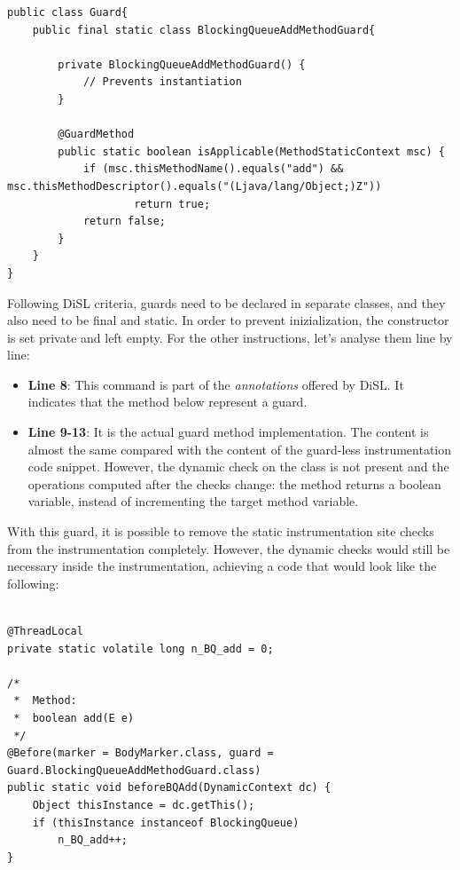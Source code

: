 \documentclass[]{usiinfthesis}
\begin{document}
\vspace*{0.5cm}
\begin{verbatim}
public class Guard{
    public final static class BlockingQueueAddMethodGuard{
    
        private BlockingQueueAddMethodGuard() {
            // Prevents instantiation
        }
    
        @GuardMethod
        public static boolean isApplicable(MethodStaticContext msc) {
            if (msc.thisMethodName().equals("add") && msc.thisMethodDescriptor().equals("(Ljava/lang/Object;)Z"))
                    return true;
            return false;
        }
    }
}
\end{verbatim}

\vspace*{0.5cm}

\noindent
Following DiSL criteria, guards need to be declared in separate classes, and they also need to be final and static. In order to prevent inizialization, the constructor is set private and left empty. For the other instructions, let's analyse them line by line:


\begin{itemize}
    \item \textbf{Line 8}: This command is part of the \textit{annotations} offered by DiSL. It indicates that the method below represent a guard.
    
    \item \textbf{Line 9-13}: It is the actual guard method implementation. The content is almost the same compared with the content of the guard-less instrumentation code snippet. However, the dynamic check on the class is not present and the operations computed after the checks change: the method returns a boolean variable, instead of incrementing the target method variable.
\end{itemize}

\noindent
With this guard, it is possible to remove the static instrumentation site checks from the instrumentation completely. However, the dynamic checks would still be necessary inside the instrumentation, achieving a code that would look like the following:


\vspace*{0.5cm}
\begin{verbatim}

@ThreadLocal
private static volatile long n_BQ_add = 0;

/*
 *  Method:
 *  boolean add(E e)
 */
@Before(marker = BodyMarker.class, guard = Guard.BlockingQueueAddMethodGuard.class)
public static void beforeBQAdd(DynamicContext dc) {
    Object thisInstance = dc.getThis();
    if (thisInstance instanceof BlockingQueue)
        n_BQ_add++;
}
\end{verbatim}
\end{document}
